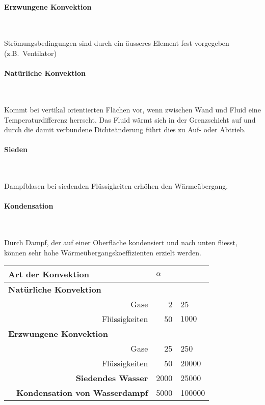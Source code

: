 			\paragraph{Erzwungene Konvektion} %
				~
				
				Strömungsbedingungen sind durch ein äusseres Element fest vorgegeben (z.B.~Ventilator)
			
			\paragraph{Natürliche Konvektion} %
				~
				
				Kommt bei vertikal orientierten Flächen vor, wenn zwischen Wand und Fluid
				eine Temperaturdifferenz herrscht. Das Fluid wärmt sich in der Grenzschicht
				auf und durch die damit verbundene Dichteänderung führt dies zu Auf- oder Abtrieb.
			
			\paragraph{Sieden} %
				~
				
				Dampfblasen bei siedenden Flüssigkeiten erhöhen den Wärmeübergang.
			
			\paragraph{Kondensation} %
				~
				
				Durch Dampf, der auf einer Oberfläche kondensiert und nach unten fliesst,
				können sehr hohe Wärmeübergangskoeffizienten erzielt werden.
			
			\begin{tabular}{lr|r@{$ - $}l}
				\multicolumn{2}{l}{\textbf{Art der Konvektion}} & \multicolumn{2}{l}{$\boldmath{\alpha}$ \niceunit{\watt\per\metre\squared\per\kelvin}} \\
				\midrule
				\multicolumn{2}{l}{\textbf{Natürliche Konvektion}} & \multicolumn{2}{l}{} \\
				& Gase & 2 & 25 \\
				& Flüssigkeiten & 50 & $1000$ \\
				\midrule
				\multicolumn{2}{l}{\textbf{Erzwungene Konvektion}} & \multicolumn{2}{l}{} \\
				& Gase & 25 & 250 \\
				& Flüssigkeiten & 50 & 20000 \\
				\midrule
				& \textbf{Siedendes Wasser} & 2000 & 25000 \\
				\midrule
				& \textbf{Kondensation von Wasserdampf} & 5000 & 100000 \\
			\end{tabular}
		
